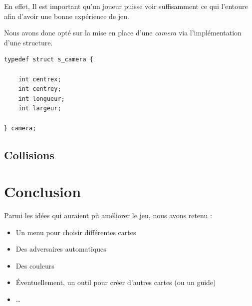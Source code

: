 \documentclass[12pt]{article}
\begin{document}
			En effet, Il est important qu'un joueur puisse voir suffisamment ce qui l'entoure afin d'avoir une bonne expérience de jeu.

			Nous avons donc opté sur la mise en place d'une \textit{camera} via l'implémentation d'une structure.
			\begin{lstlisting}[title=Structure Camera]
typedef struct s_camera {
	
	int centrex;
	int centrey;
	int longueur;
	int largeur;
				
} camera;
			\end{lstlisting}

		\subsection{Collisions}
		
		
		

	\section{Conclusion}

	Parmi les idées qui auraient pû améliorer le jeu, nous avons retenu :
	\begin{itemize}
		\item Un menu pour choisir différentes cartes
		\item Des adversaires automatiques
		\item Des couleurs
		\item Éventuellement, un outil pour créer d'autres cartes (ou un guide)
		\item \dots
	\end{itemize}
		
\end{document}
